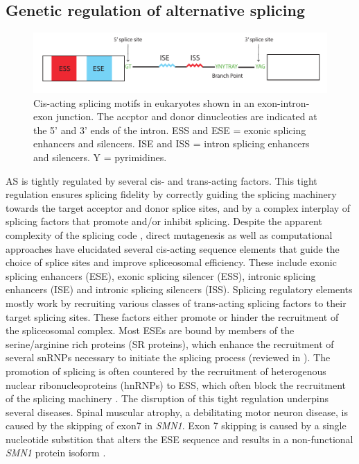\subsection{Genetic regulation of alternative splicing}
\begin{figure}[H]
    \centering
    \includegraphics[width=\textwidth]{splicing_motifs}
    \caption{Cis-acting splicing motifs in eukaryotes shown in an exon-intron-exon junction. The accptor and donor dinucleoties are indicated at the 5' and 3' ends of the intron. ESS and ESE = exonic splicing enhancers and silencers. ISE and ISS = intron splicing enhancers and silencers. Y = pyrimidines.}
    \label{fig:splicing_motifs}   
  \end{figure}
AS is tightly regulated by several cis- and trans-acting factors. This tight regulation ensures splicing fidelity by correctly guiding the splicing machinery towards the target acceptor and donor splice sites, and by a complex interplay of splicing factors that promote and/or inhibit splicing. Despite the apparent complexity of the splicing code \cite{Jaganathan2019-ah}, direct mutagenesis as well as computational approaches have elucidated several cis-acting sequence elements that guide the choice of splice sites and improve spliceosomal efficiency. These include exonic splicing enhancers (ESE), exonic splicing silencer (ESS), intronic splicing enhancers (ISE) and intronic splicing silencers (ISS). Splicing regulatory elements mostly work by recruiting various classes of trans-acting splicing factors to their target splicing sites. These factors either promote or hinder the recruitment of the spliceosomal complex. Most ESEs are bound by members of the serine/arginine rich proteins (SR proteins), which enhance the recruitment of several snRNPs necessary to initiate the splicing process (reviewed in \cite{Shepard2009-os}). The promotion of splicing is often countered by the recruitment of heterogenous nuclear ribonucleoproteins (hnRNPs) to ESS, which often block the recruitment of the splicing machinery \cite{Geuens2016-yz}. The disruption of this tight regulation underpins several diseases. Spinal muscular atrophy, a debilitating motor neuron disease, is caused by the skipping of exon7 in \textit{SMN1}. Exon 7 skipping is caused by a single nucleotide substition that alters the ESE sequence and results in a non-functional \textit{SMN1} protein isoform \cite{Monani1999-vf}.\\


